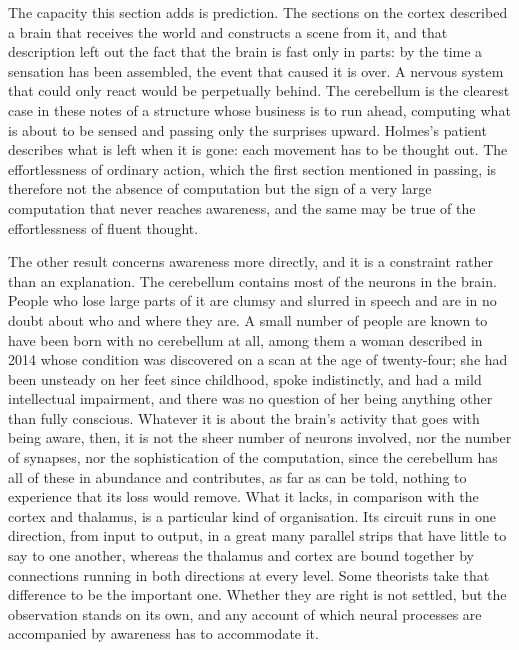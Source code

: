 \documentclass[11pt]{article}
\begin{document}
The capacity this section adds is prediction. The sections on the cortex described a brain that receives the world and constructs a scene from it, and that description left out the fact that the brain is fast only in parts: by the time a sensation has been assembled, the event that caused it is over. A nervous system that could only react would be perpetually behind. The cerebellum is the clearest case in these notes of a structure whose business is to run ahead, computing what is about to be sensed and passing only the surprises upward. Holmes's patient describes what is left when it is gone: each movement has to be thought out. The effortlessness of ordinary action, which the first section mentioned in passing, is therefore not the absence of computation but the sign of a very large computation that never reaches awareness, and the same may be true of the effortlessness of fluent thought.

The other result concerns awareness more directly, and it is a constraint rather than an explanation. The cerebellum contains most of the neurons in the brain. People who lose large parts of it are clumsy and slurred in speech and are in no doubt about who and where they are. A small number of people are known to have been born with no cerebellum at all, among them a woman described in 2014 whose condition was discovered on a scan at the age of twenty-four; she had been unsteady on her feet since childhood, spoke indistinctly, and had a mild intellectual impairment, and there was no question of her being anything other than fully conscious. Whatever it is about the brain's activity that goes with being aware, then, it is not the sheer number of neurons involved, nor the number of synapses, nor the sophistication of the computation, since the cerebellum has all of these in abundance and contributes, as far as can be told, nothing to experience that its loss would remove. What it lacks, in comparison with the cortex and thalamus, is a particular kind of organisation. Its circuit runs in one direction, from input to output, in a great many parallel strips that have little to say to one another, whereas the thalamus and cortex are bound together by connections running in both directions at every level. Some theorists take that difference to be the important one. Whether they are right is not settled, but the observation stands on its own, and any account of which neural processes are accompanied by awareness has to accommodate it.
\end{document}
